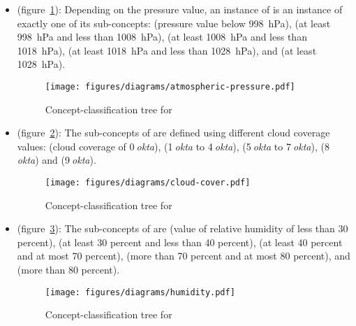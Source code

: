 \begin{itemize}
  \item {} (figure~\ref{fig:tree_atmospheric_pressure}): Depending on the pressure value, an instance of  is an instance of exactly one of its sub-concepts:  (pressure value below \SI{998}{\hecto\pascal}),  (at least \SI{998}{\hecto\pascal} and less than \SI{1008}{\hecto\pascal}),  (at least \SI{1008}{\hecto\pascal} and less than \SI{1018}{\hecto\pascal}),  (at least \SI{1018}{\hecto\pascal} and less than \SI{1028}{\hecto\pascal}), and  (at least \SI{1028}{\hecto\pascal}).
  
  \begin{figure}
    \centering
    \texttt{[image: figures/diagrams/atmospheric-pressure.pdf]}
    \caption{Concept-classification tree for }
    \label{fig:tree_atmospheric_pressure}
  \end{figure}

  \item {} (figure~\ref{fig:tree_cloud_cover}): The sub-concepts of  are defined using different cloud coverage values:  (cloud coverage of \num{0}$\:$\emph{okta}),  (\num{1}$\:$\emph{okta} to \num{4}$\:$\emph{okta}),  (\num{5}$\:$\emph{okta} to \num{7}$\:$\emph{okta}),  (\num{8}$\:$\emph{okta}) and  (\num{9}$\:$\emph{okta}).
  
  \begin{figure}
    \centering
    \texttt{[image: figures/diagrams/cloud-cover.pdf]}
    \caption{Concept-classification tree for }
    \label{fig:tree_cloud_cover}
  \end{figure}

  \item {} (figure~\ref{fig:tree_humidity}): The sub-concepts of  are  (value of relative humidity of less than \num{30} percent),  (at least \num{30} percent and less than \num{40} percent),  (at least \num{40} percent and at most \num{70} percent),  (more than \num{70} percent and at most \num{80} percent), and  (more than \num{80} percent).
  
  \begin{figure}
    \centering
    \texttt{[image: figures/diagrams/humidity.pdf]}
    \caption{Concept-classification tree for }
    \label{fig:tree_humidity}
  \end{figure}


\end{itemize}
